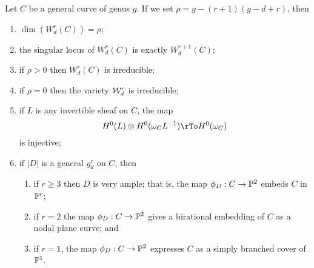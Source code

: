\begin{theorem}
Let $C$ be a general curve of genus $g$. If we set $\rho = g - (r+1)(g-d+r)$, then
\begin{enumerate}
\item $\dim(W^r_d(C)) = \rho$;
\item the singular locus of $W^r_d(C)$ is exactly $W^{r+1}_d(C)$;
\item if $\rho > 0$ then $W^r_d(C)$ is irreducible;
\item if $\rho = 0$ then the variety ${\mathcal W}^r_d$ is irreducible;
\item if $L$ is any invertible sheaf on $C$, the map
$$
H^0(L) \otimes H^0(\omega_CL^{-1}) \rTo H^0(\omega_C)
$$
is injective;
\item if $|D|$ is a general $g^r_d$ on $C$, then
\begin{enumerate}
\item if $r \geq 3$ then $D$ is very ample; that is, the map $\phi_D : C \to {\mathbb P}^2$   embeds $C$ in ${\mathbb P}^r$;
\item if $r=2$ the map $\phi_D : C \to {\mathbb P}^2$ gives a birational embedding of $C$ as a nodal plane curve; and 
\item if $r=1$, the map $\phi_D : C \to {\mathbb P}^2$ expresses $C$ as a simply branched cover of ${\mathbb P}^1$.
\end{enumerate}
\end{enumerate}
\end{theorem}



